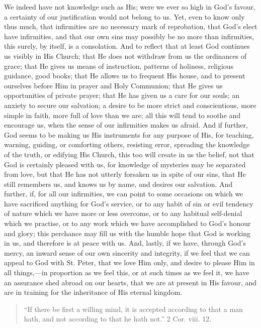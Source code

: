 We indeed have not knowledge such as His; were we ever so high in
God's favour, a certainty of our justification would not belong to us.
Yet, even to know only thus much, that infirmities are no necessary
mark of reprobation, that God's elect have infirmities, and that our
own sins may possibly be no more than infirmities, this surely, by
itself, is a consolation. And to reflect that at least God continues
us visibly in His Church; that He does not withdraw from us the
ordinances of grace; that He gives us means of instruction, patterns
of holiness, religious guidance, good books; that He allows us to
frequent His house, and to present ourselves before Him in prayer and
Holy Communion; that He gives us opportunities of private prayer; that
He has given us a care for our souls; an anxiety to secure our
salvation; a desire to be more strict and conscientious, more simple
in faith, more full of love than we are; all this will tend to soothe
and encourage us, when the sense of our infirmities makes us afraid.
And if further, God seems to be making us His instruments for any
purpose of His, for teaching, warning, guiding, or comforting others,
resisting error, spreading the knowledge of the truth, or edifying His
Church, this too will create in us the belief, not that God is
certainly pleased with us, for knowledge of mysteries may be separated
from love, but that He has not utterly forsaken us in spite of our
sins, that He still remembers us, and knows us by name, and desires
our salvation. And further, if, for all our infirmities, we can point
to some occasions on which we have sacrificed anything for God's
service, or to any habit of sin or evil tendency of nature which we
have more or less overcome, or to any habitual self-denial which we
practise, or to any work which we have accomplished to God's honour
and glory; this perchance may fill us with the humble hope that God is
working in us, and therefore is at peace with us. And, lastly, if we
have, through God's mercy, an inward sense of our own sincerity and
integrity, if we feel that we can appeal to God with St. Peter, that
we love Him only, and desire to please Him in all things,—in
proportion as we feel this, or at such times as we feel it, we have an
assurance shed abroad on our hearts, that we are at present in His
favour, and are in training for the inheritance of His eternal
kingdom.


\begin{quote}

``If there be first a willing mind, it is accepted according
to that a man hath, and not according to that he hath not.'' 2
Cor. viii. 12.

\end{quote}

